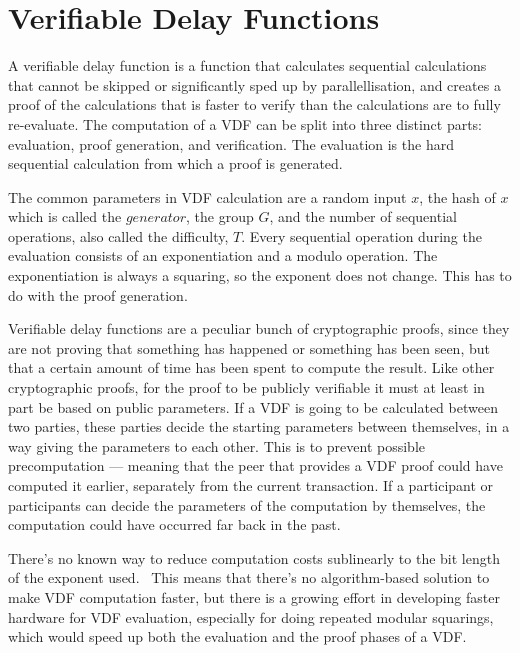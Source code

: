 \section{Verifiable Delay Functions}
\label{VDF}

A verifiable delay function is a function that calculates sequential calculations that cannot be skipped or significantly sped up by parallellisation, and creates a proof of the calculations that is faster to verify than the calculations are to fully re-evaluate. The computation of a VDF can be split into three distinct parts: evaluation, proof generation, and verification. The evaluation is the hard sequential calculation from which a proof is generated.~\cite{Boneh2018-sm}

The common parameters in VDF calculation are a random input \(x\), the hash of \(x\) which is called the \(generator\), the group \(G\), and the number of sequential operations, also called the difficulty, \(T\). Every sequential operation during the evaluation consists of an exponentiation and a modulo operation. The exponentiation is always a squaring, so the exponent does not change. This has to do with the proof generation.

Verifiable delay functions are a peculiar bunch of cryptographic proofs, since they are not proving that something has happened or something has been seen, but that a certain amount of time has been spent to compute the result. Like other cryptographic proofs, for the proof to be publicly verifiable it must at least in part be based on public parameters. If a VDF is going to be calculated between two parties, these parties decide the starting parameters between themselves, in a way giving the parameters to each other. This is to prevent possible precomputation --- meaning that the peer that provides a VDF proof could have computed it earlier, separately from the current transaction. If a participant or participants can decide the parameters of the computation by themselves, the computation could have occurred far back in the past.

There's no known way to reduce computation costs sublinearly to the bit length of the exponent used.~\cite{Boneh2018-sm} This means that there's no algorithm-based solution to make VDF computation faster, but there is a growing effort in developing faster hardware for VDF evaluation, especially for doing repeated modular squarings, which would speed up both the evaluation and the proof phases of a VDF.~\cite{noauthor_undated-jb, noauthor_undated-da, Simonatsn2020-ki}

